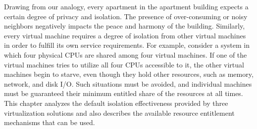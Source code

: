 Drawing from our analogy, every apartment in the apartment building expects a certain degree of privacy and isolation. The presence of over-consuming or noisy neighbors negatively impacts the peace and harmony of the building. Similarly, every virtual machine requires a degree of isolation from other virtual machines in order to fulfill its own service requirements. For example, consider a system in which four physical CPUs are shared among four virtual machines. If one of the virtual machines tries to utilize all four CPUs accessible to it, the other virtual machines begin to starve, even though they hold other resources, such as memory, network, and disk I/O. Such situations must be avoided, and individual machines must be guaranteed their minimum entitled share of the resources at all times. This chapter analyzes the default isolation effectiveness provided by three virtualization solutions and also describes the available resource entitlement mechanisms that can be used.


